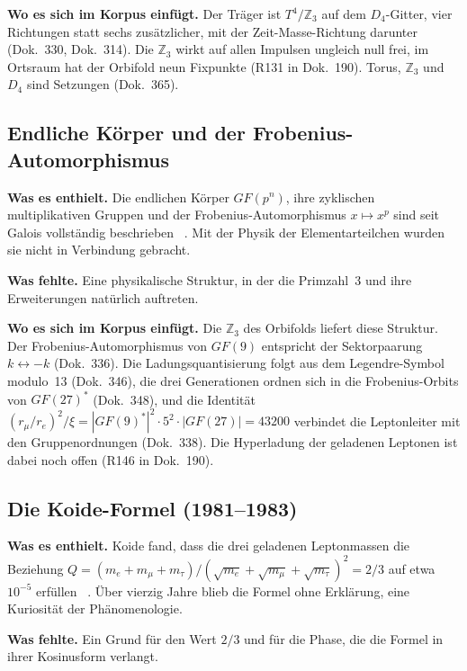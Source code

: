 \textbf{Wo es sich im Korpus einfügt.} Der Träger ist $T^4/\mathbb{Z}_3$ auf dem $D_4$-Gitter, vier
Richtungen statt sechs zusätzlicher, mit der Zeit-Masse-Richtung darunter (Dok.~330, Dok.~314).
Die $\mathbb{Z}_3$ wirkt auf allen Impulsen ungleich null frei, im Ortsraum hat der Orbifold neun
Fixpunkte (R131 in Dok.~190). Torus, $\mathbb{Z}_3$ und $D_4$ sind Setzungen \SetzM{} (Dok.~365).

\subsection{Endliche Körper und der Frobenius-Automorphismus}
\label{sec:galois390}

\textbf{Was es enthielt.} Die endlichen Körper $GF(p^n)$, ihre zyklischen multiplikativen Gruppen
und der Frobenius-Automorphismus $x\mapsto x^p$ sind seit Galois vollständig beschrieben
\EM~\cite{Lidl1997}. Mit der Physik der Elementarteilchen wurden sie nicht in Verbindung gebracht.

\textbf{Was fehlte.} Eine physikalische Struktur, in der die Primzahl~3 und ihre Erweiterungen
natürlich auftreten.

\textbf{Wo es sich im Korpus einfügt.} Die $\mathbb{Z}_3$ des Orbifolds liefert diese Struktur. Der
Frobenius-Automorphismus von $GF(9)$ entspricht der Sektorpaarung $k\leftrightarrow-k$ \BM{}
(Dok.~336). Die Ladungsquantisierung folgt aus dem Legendre-Symbol modulo~13 \BM{} (Dok.~346),
die drei Generationen ordnen sich in die Frobenius-Orbits von $GF(27)^*$ \BM{} (Dok.~348), und die
Identität $(r_\mu/r_e)^2/\xi=|GF(9)^*|^2\cdot5^2\cdot|GF(27)|=43200$ verbindet die Leptonleiter mit
den Gruppenordnungen \KM{} (Dok.~338). Die Hyperladung der geladenen Leptonen ist dabei noch
offen (R146 in Dok.~190).

\subsection{Die Koide-Formel (1981--1983)}

\textbf{Was es enthielt.} Koide fand, dass die drei geladenen Leptonmassen die Beziehung
$Q=(m_e+m_\mu+m_\tau)/(\sqrt{m_e}+\sqrt{m_\mu}+\sqrt{m_\tau})^2=2/3$ auf etwa
$10^{-5}$ erfüllen \QM~\cite{Koide1983}. Über vierzig Jahre blieb die Formel ohne Erklärung,
eine Kuriosität der Phänomenologie.

\textbf{Was fehlte.} Ein Grund für den Wert $2/3$ und für die Phase, die die Formel in ihrer
Kosinusform verlangt.

